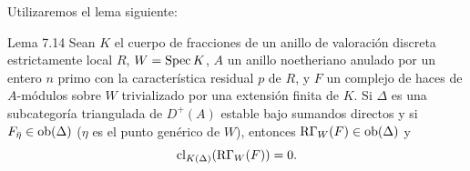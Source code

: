 Utilizaremos el lema siguiente:

\begin{statement}{Lema 7.14}
Sean $K$ el cuerpo de fracciones de un anillo de valoración discreta estrictamente local $R$, $W=\operatorname{Spec} K$, $A$ un anillo noetheriano anulado por un entero $n$ primo con la característica residual $p$ de $R$, y $F$ un complejo de haces de $A$-módulos sobre $W$ trivializado por una extensión finita de $K$. Si $\Delta$ es una subcategoría triangulada de $D^+(A)$ estable bajo sumandos directos y si $F_{\bar\eta}\in\operatorname{ob}(\Delta)$ ($\eta$ es el punto genérico de $W$), entonces $\mathrm{R}\Gamma_W(F)\in\operatorname{ob}(\Delta)$ y
\[
\operatorname{cl}_{K(\Delta)}(\mathrm{R}\Gamma_W(F))=0.
\]
\end{statement}
